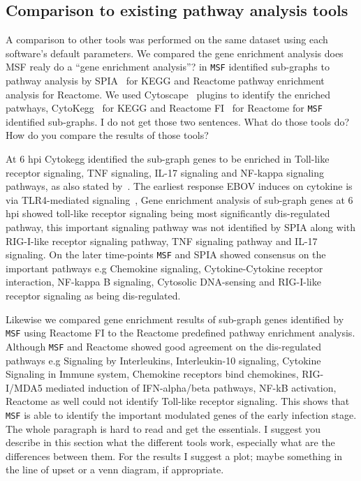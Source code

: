 \documentclass[10pt,a4paper,twocolumn]{article}
\newcommand{\TODO}[1]{\begingroup\color{red}#1\endgroup}
\begin{document}
\subsection*{Comparison to existing pathway analysis tools}

 A comparison to other tools was performed on the same dataset using
 each software's default parameters. We compared the gene enrichment
 analysis \TODO{does MSF realy do a ``gene enrichment analysis''?} in
 \texttt{MSF} identified sub-graphs to pathway analysis by
 SPIA~\cite{Tarca} for KEGG and Reactome pathway enrichment analysis
 for Reactome.  We used Cytoscape~\cite{Cyto} plugins to identify the
 enriched patwhays, CytoKegg~\cite{Cytokegg} for KEGG and Reactome
 FI~\cite{Reactome} for Reactome for \texttt{MSF} identified
 sub-graphs. \TODO{I do not get those two sentences. What do those
   tools do? How do you compare the results of those tools?}

At 6 hpi Cytokegg identified the sub-graph genes to be enriched in
Toll-like receptor signaling, TNF signaling, IL-17 signaling and
NF-kappa signaling pathways, as also stated by~\cite{Olejnik}. The
earliest response EBOV induces on cytokine is via TLR4-mediated
signaling~\cite{Olejnik}, Gene enrichment analysis of sub-graph genes
at 6 hpi showed toll-like receptor signaling being most significantly
dis-regulated pathway, this important signaling pathway was not
identified by SPIA along with RIG-I-like receptor signaling pathway,
TNF signaling pathway and IL-17 signaling. On the later time-points
\texttt{MSF} and SPIA showed consensus on the important pathways e.g
Chemokine signaling, Cytokine-Cytokine receptor interaction, NF-kappa
B signaling, Cytosolic DNA-sensing and RIG-I-like receptor signaling
as being dis-regulated.

Likewise we compared gene enrichment results of sub-graph genes
identified by \texttt{MSF} using Reactome FI to the Reactome
predefined pathway enrichment analysis. Although \texttt{MSF} and
Reactome showed good agreement on the dis-regulated pathways e.g
Signaling by Interleukins, Interleukin-10 signaling, Cytokine
Signaling in Immune system, Chemokine receptors bind chemokines,
RIG-I/MDA5 mediated induction of IFN-alpha/beta pathways, NF-kB
activation, Reactome as well could not identify Toll-like receptor
signaling. This shows that \texttt{MSF} is able to identify the
important modulated genes of the early infection stage. \TODO{The
  whole paragraph is hard to read and get the essentials. I suggest
  you describe in this section what the different tools work,
  especially what are the differences between them. For the results I
  suggest a plot; maybe something in the line of upset or a venn
  diagram, if appropriate.}
\end{document}
